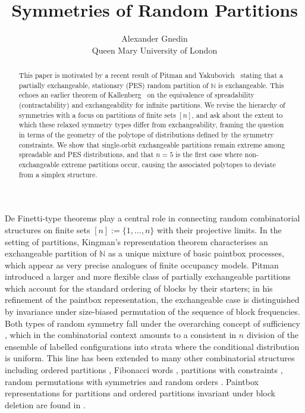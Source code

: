 \documentclass{article}
\begin{document}
\title{{Symmetries of Random Partitions}}
\author{Alexander Gnedin\\ {\small Queen Mary University of London}} 



\maketitle
\begin{abstract}
\noindent
This paper is motivated by a recent result of Pitman and Yakubovich~\cite{PY} stating that a partially exchangeable, stationary (PES) random partition of $\mathbb{N}$ is exchangeable. This echoes an earlier theorem of Kallenberg~\cite{Kallenberg} on the equivalence of spreadability (contractability) and exchangeability for infinite partitions. We revise the hierarchy of symmetries with a focus on partitions of finite sets $[n]$, and ask about the extent to which these relaxed symmetry types differ from exchangeability, framing the question in terms of the geometry of the polytope of distributions defined by the symmetry constraints. We show that single-orbit exchangeable partitions remain extreme among spreadable and PES distributions, and that $n=5$ is the first case where non-exchangeable extreme partitions occur, causing the associated polytopes to deviate from a simplex structure.
\end{abstract}
\noindent
De Finetti-type theorems play a central role in connecting random combinatorial structures on finite sets $[n]:=\{1,\ldots,n\}$ with their projective limits.
In the setting of partitions, Kingman's representation theorem \cite{Kingman} characterises an exchangeable partition of ${\mathbb N}$ as a unique mixture of basic paintbox processes, which appear as very precise analogues of finite occupancy models.
Pitman \cite{PitmanPTRF} introduced a larger and more flexible class of partially exchangeable partitions which account for the standard ordering of blocks by their starters; in his refinement of the paintbox representation, the exchangeable case is distinguished by invariance under size-biased permutation of the sequence of block frequencies.
Both types of random symmetry fall under the overarching concept of sufficiency \cite{DF, Dynkin}, which in the combinatorial context amounts to a consistent in $n$ division of the ensemble of labelled configurations into strata where the conditional distribution is uniform.
This line has been extended to many other combinatorial structures including ordered partitions \cite{GRCS}, Fibonacci words \cite{Goodman}, partitions with constraints \cite{GCEP}, random permutations with symmetries \cite{G11, GGorinRec, GGorinPer, Kerov} and random orders \cite{GO, Jacka}.
Paintbox representations for partitions and ordered partitions invariant under block deletion are found in \cite{GHP, RCS, selfsimilar}.
\end{document}
